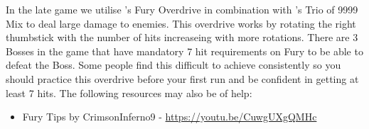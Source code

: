 In the late game we utilise \lulu's Fury Overdrive in combination with \rikku's Trio of 9999 Mix to deal large damage to enemies. This overdrive works by rotating the right thumbstick with the number of hits increaseing with more rotations. There are 3 Bosses in the game that have mandatory 7 hit requirements on Fury to be able to defeat the Boss. Some people find this difficult to achieve consistently so you should practice this overdrive before your first run and be confident in getting at least 7 hits. The following resources may also be of help:

\vspace{\baselineskip}

\begin{itemize}

	\item Fury Tips by CrimsonInferno9 - \url{https://youtu.be/CuwgUXgQMHc}

\end{itemize}

\newpage